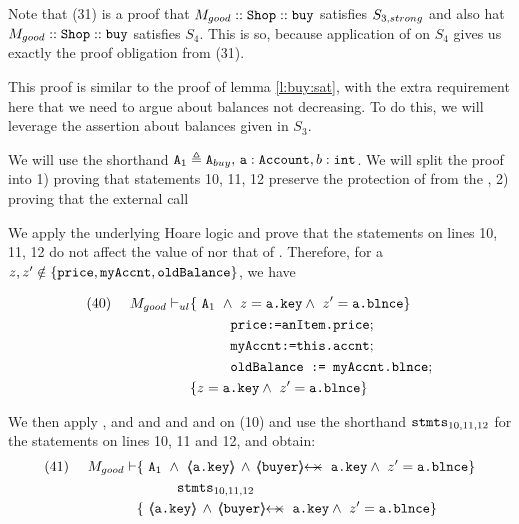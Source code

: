 \begin{proofO}
Note that (31) is a proof that $M_{good}::\mbox{\normalfont{\texttt{Shop}}}::\mbox{\normalfont{\texttt{buy}}}$  satisfies $S_{3,strong}$ and also  hat $M_{good}::\mbox{\normalfont{\texttt{Shop}}}::\mbox{\normalfont{\texttt{buy}}}$  satisfies $S_4$. This is so, because application of {\sc{[Method]}} on $S_4$ gives us exactly the proof obligation from (31).

This proof is similar to the proof of lemma \ref{l:buy:sat}, with the extra requirement here that we need to argue about balances not decreasing.
To do this, we will leverage the assertion about balances given in $S_3$.

We will use the shorthand $\mbox{\normalfont{\texttt{A}}}_{1} \triangleq \mbox{\normalfont{\texttt{A}}}_{buy}, \,\mbox{\normalfont{\texttt{a}}}:\mbox{\normalfont{\texttt{Account}}}, b:\mbox{\normalfont{\texttt{int}}}$.
We will split the proof into 1) proving that statements 10, 11, 12 preserve the protection of  from the , 2) proving that the external call 


We apply the underlying Hoare logic and prove that the statements on lines 10, 11, 12 do not affect the value of  nor that of .  Therefore, for a $z,z'\notin \{ \mbox{\normalfont{\texttt{price}}}, \mbox{\normalfont{\texttt{myAccnt}}}, \mbox{\normalfont{\texttt{oldBalance}}} \}$, we have 

\begin{align*}
\text{(40)}  \ \ \ \ {M_{good} \vdash_{ul}} 
		&	\{  \ \Alocalsb\  \wedge\ z=\prg{a.key} \wedge\ z'=\prg{a.\balance}  \} \\
		&   \SPT \prg{price:=anItem.price}; \\  
		&   \SPT \prg{myAccnt:=this.accnt}; \\  
                 &   \SPT \prg{oldBalance := myAccnt.blnce};\\
		& \{ z=\prg{a.key} \wedge\ z'=\prg{a.\balance} \}
\end{align*}

We then apply {}, {} and {} and {} and and {} on (10) and use the shorthand $\mbox{\normalfont{\texttt{stmts}}}_{10,11,12}$ for the statements on lines 10, 11 and 12, and obtain: 
\\
\begin{align*}
\text{(41)}  \ \ \ \ M_{good} \vdash 
		&	\{  \ \Alocalsb\  \wedge\ {\inside{\prg{a.key}}} \, \wedge\, \protectedFrom{\prg{buyer}} {\prg{a.key}} \wedge\ z'=\prg{a.\balance}  \} \\
		& \SPT \stmtsP\ \\  
		& \{ \ {\inside{\prg{a.key}}}  \, \wedge\, \protectedFrom{\prg{buyer}} {\prg{a.key}} \wedge\ z'=\prg{a.\balance}   \}
\end{align*}




\end{proofO}
